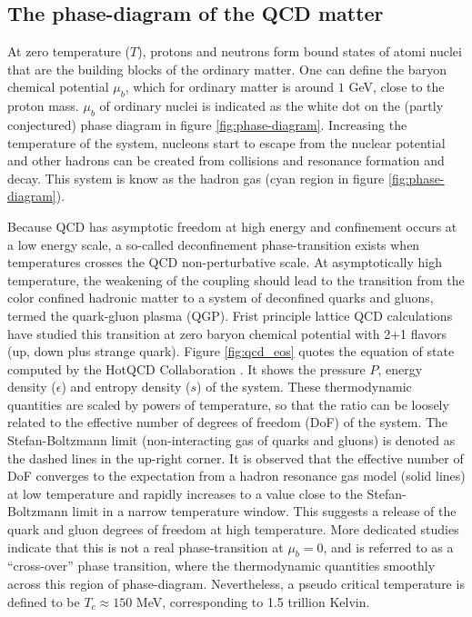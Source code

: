 \subsection{The phase-diagram of the QCD matter}
At zero temperature ($T$), protons and neutrons form bound states of atomi nuclei that are the building blocks of the ordinary matter.
One can define the baryon chemical potential $\mu_b$, which for ordinary matter is around $1$ GeV, close to the proton mass.
$\mu_b$ of ordinary nuclei is indicated as the white dot on the (partly conjectured) phase diagram in figure \ref{fig:phase-diagram}.
Increasing the temperature of the system, nucleons start to escape from the nuclear potential and other hadrons can be created from collisions and resonance formation and decay.
This system is know as the hadron gas (cyan region in figure \ref{fig:phase-diagram}).

Because QCD has asymptotic freedom at high energy and confinement occurs at a low energy scale, a so-called deconfinement phase-transition exists when temperatures crosses the QCD non-perturbative scale.
At asymptotically high temperature, the weakening of the coupling should lead to the transition from the color confined hadronic matter to a system of deconfined quarks and gluons, termed the quark-gluon plasma (QGP). 
Frist principle lattice QCD calculations have studied this transition at zero baryon chemical potential with 2+1 flavors (up, down plus strange quark).
Figure \ref{fig:qcd_eos} quotes the equation of state computed by the HotQCD Collaboration \cite{Bazavov:2014pvz}.
It shows the pressure $P$, energy density ($\epsilon$) and entropy density ($s$) of the system.
These thermodynamic quantities are scaled by powers of temperature, so that the ratio can be loosely related to the effective number of degrees of freedom (DoF) of the system.
The Stefan-Boltzmann limit (non-interacting gas of quarks and gluons) is denoted as the dashed lines in the up-right corner.
It is observed that the effective number of DoF converges to the expectation from a hadron resonance gas model (solid lines) at low temperature and rapidly increases to a value close to the Stefan-Boltzmann limit in a narrow temperature window.
This suggests a release of the quark and gluon degrees of freedom at high temperature.
More dedicated studies indicate that this is not a real phase-transition at $\mu_b = 0$, and is referred to as a ``cross-over'' phase transition, where the thermodynamic quantities smoothly across this region of phase-diagram.
Nevertheless, a pseudo critical temperature is defined to be $T_c \approx 150 $ MeV, corresponding to 1.5 trillion Kelvin.

